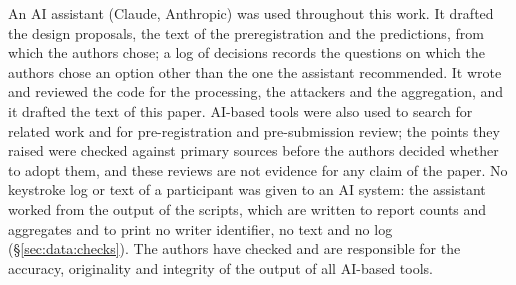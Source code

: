 \begin{ai}
An AI assistant (Claude, Anthropic) was used throughout this work. It drafted the design proposals, the text of the
preregistration and the predictions, from which the authors chose; a log of decisions records the questions on which
the authors chose an option other than the one the assistant recommended. It wrote and reviewed the code for the
processing, the attackers and the aggregation, and it drafted the text of this paper. AI-based tools were also used to
search for related work and for pre-registration and pre-submission review; the points they raised were checked
against primary sources before the authors decided whether to adopt them, and these reviews are not evidence for any
claim of the paper. No keystroke log or text of a participant was given to an AI system: the assistant worked from the
output of the scripts, which are written to report counts and aggregates and to print no writer identifier, no
text and no log (\S\ref{sec:data:checks}). The authors have checked and are responsible for the accuracy, originality and integrity of the output of all AI-based tools.
\end{ai}
